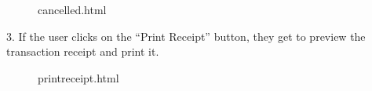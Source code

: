 \documentclass[12pt]{report}
\begin{document}
\begin{figure}[H]
	\caption{\label{fig:cancelled}cancelled.html}	
\end{figure}


3.	If the user clicks on the “Print Receipt” button, they get to preview the transaction receipt and print it.

\begin{figure}[H]
	\caption{\label{fig:printreceipt}printreceipt.html}	
\end{figure}
\end{document}
